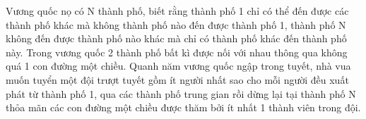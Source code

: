 Vương quốc nọ có N thành phố, biết rằng thành phố 1 chỉ có thể đến được các thành phố khác mà không thành phố nào đến được thành phố 1, thành phố N không đến được thành phố nào khác mà chỉ có thành phố khác đến thành phố này. Trong vương quốc 2 thành phố bất kì được nối với nhau thông qua không quá 1 con đường một chiều. Quanh năm vương quốc ngập trong tuyết, nhà vua muốn tuyển một đội trượt tuyết gồm ít người nhất sao cho mỗi người đều xuất phát từ thành phố 1, qua các thành phố trung gian rồi dừng lại tại thành phố N thỏa mãn các con đường một chiều được thăm bởi ít nhất 1 thành viên trong đội.  

\